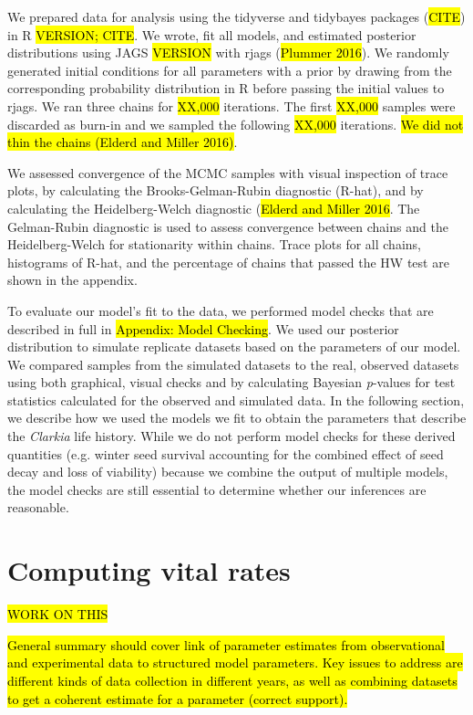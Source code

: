 \documentclass[12pt, oneside, titlepage]{article}   	%
\begin{document}
We prepared data for analysis using the tidyverse and tidybayes packages (\hl{CITE}) in R \hl{VERSION; CITE}. We wrote, fit all models, and estimated posterior distributions using JAGS \hl{VERSION} with rjags (\hl{Plummer 2016}). We randomly generated initial conditions for all parameters with a prior by drawing from the corresponding probability distribution in R before passing the initial values to rjags. We ran three chains for \hl{XX,000} iterations. The first \hl{XX,000} samples were discarded as burn-in and we sampled the following \hl{XX,000} iterations. \hl{We did not thin the chains (Elderd and Miller 2016)}.

We assessed convergence of the MCMC samples with visual inspection of trace plots, by calculating the Brooks-Gelman-Rubin diagnostic (R-hat), and by calculating the Heidelberg-Welch diagnostic (\hl{Elderd and Miller 2016}. The Gelman-Rubin diagnostic is used to assess convergence between chains and the Heidelberg-Welch for stationarity within chains. Trace plots for all chains, histograms of R-hat, and the percentage of chains that passed the HW test are shown in the appendix. 
 
To evaluate our model's fit to the data, we performed model checks that are described in full in \hl{Appendix: Model Checking}. We used our posterior distribution to simulate replicate datasets based on the parameters of our model. We compared samples from the simulated datasets to the real, observed datasets using both graphical, visual checks and by calculating Bayesian \textit{p}-values for test statistics calculated for the observed and simulated data. In the following section, we describe how we used the models we fit to obtain the parameters that describe the \textit{Clarkia} life history. While we do not perform model checks for these derived quantities (e.g. winter seed survival accounting for the combined effect of seed decay and loss of viability) because we combine the output of multiple models, the model checks are still essential to determine whether our inferences are reasonable.

\section{Computing vital rates}

\hl{WORK ON THIS}

\hl{General summary should cover link of parameter estimates from observational and experimental data to structured model parameters. Key issues to address are different kinds of data collection in different years, as well as combining datasets to get a coherent estimate for a parameter (correct support).}
\end{document}
